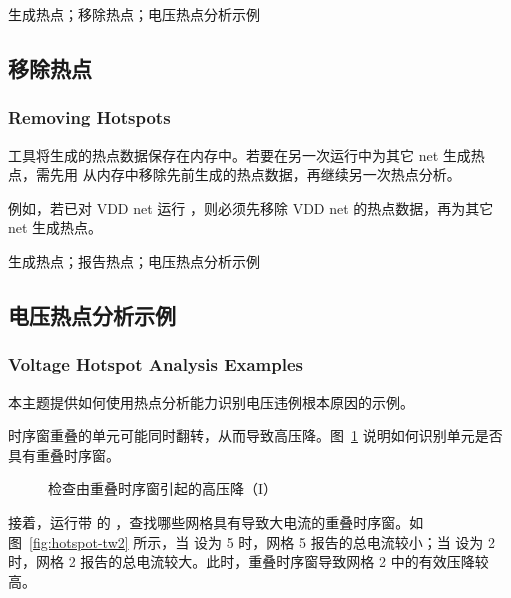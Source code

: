 \begin{seeAlsoBox}
生成热点；移除热点；电压热点分析示例
\end{seeAlsoBox}

\subsection{移除热点}
\subsubsection*{Removing Hotspots}

工具将生成的热点数据保存在内存中。若要在另一次运行中为其它 net 生成热点，需先用  从内存中移除先前生成的热点数据，再继续另一次热点分析。

例如，若已对 VDD net 运行 ，则必须先移除 VDD net 的热点数据，再为其它 net 生成热点。

\begin{seeAlsoBox}
生成热点；报告热点；电压热点分析示例
\end{seeAlsoBox}

\subsection{电压热点分析示例}
\subsubsection*{Voltage Hotspot Analysis Examples}

本主题提供如何使用热点分析能力识别电压违例根本原因的示例。

时序窗重叠的单元可能同时翻转，从而导致高压降。图~\ref{fig:hotspot-tw1} 说明如何识别单元是否具有重叠时序窗。

\begin{figure}[htbp]
\centering
{}
\caption{检查由重叠时序窗引起的高压降（I）}
\label{fig:hotspot-tw1}
\end{figure}

接着，运行带  的 ，查找哪些网格具有导致大电流的重叠时序窗。如图~\ref{fig:hotspot-tw2} 所示，当  设为 5 时，网格 5 报告的总电流较小；当  设为 2 时，网格 2 报告的总电流较大。此时，重叠时序窗导致网格 2 中的有效压降较高。

